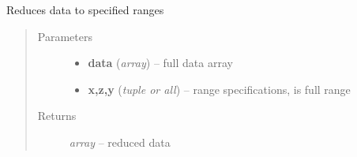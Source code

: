 \documentclass[letterpaper,10pt,english]{sphinxmanual}
\begin{document}
\begin{fulllineitems}
\label{api/ClearMap.IO:ClearMap.IO.IO.dataToRange}
Reduces data to specified ranges
\begin{quote}\begin{description}
\item[{Parameters}] \leavevmode\begin{itemize}
\item {} 
\textbf{data} (\emph{array}) --
full data array

\item {} 
\textbf{x,z,y} (\emph{tuple or all}) --
range specifications,  is full range

\end{itemize}

\item[{Returns}] \leavevmode
\emph{array} --
reduced data

\end{description}\end{quote}




{\hyperref[api/ClearMap.IO:ClearMap.IO.IO.dataSizeFromDataRange]{\emph{}}}



\end{fulllineitems}

\end{document}
